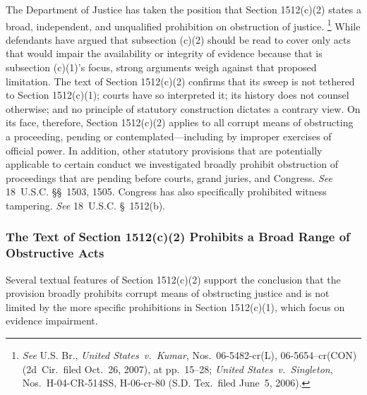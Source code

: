 The Department of Justice has taken the position that Section 1512(c)(2) states a broad, independent, and unqualified prohibition on obstruction of justice.%
\footnote{\textit{See} U.S. Br., \textit{United States~v.\ Kumar}, Nos.~06-5482-cr(L), 06-5654--cr(CON) (2d~Cir.\ filed Oct.~26, 2007), at pp.~15--28; \textit{United States~v.\ Singleton}, Nos.~H-04-CR-514SS, H-06-cr-80 (S.D. Tex.\ filed June~5, 2006).}
While defendants have argued that subsection (c)(2) should be read to cover only acts that would impair the availability or integrity of evidence because that is subsection (c)(1)'s focus, strong arguments weigh against that proposed limitation.
The text of Section 1512(c)(2) confirms that its sweep is not tethered to Section 1512(c)(1); courts have so interpreted it; its history does not counsel otherwise; and no principle of statutory construction dictates a contrary view.
On its face, therefore, Section 1512(c)(2) applies to all corrupt means of obstructing a proceeding, pending or contemplated---including by improper exercises of official power.
In addition, other statutory provisions that are potentially applicable to certain conduct we investigated broadly prohibit obstruction of proceedings that are pending before courts, grand juries, and Congress.
\textit{See} 18~U.S.C. \S\S~1503, 1505.
Congress has also specifically prohibited witness tampering.
\textit{See} 18~U.S.C. \S~1512(b).

\subsubsection{The Text of Section 1512(c)(2) Prohibits a Broad Range of Obstructive Acts}

Several textual features of Section 1512(c)(2) support the conclusion that the provision broadly prohibits corrupt means of obstructing justice and is not limited by the more specific prohibitions in Section 1512(c)(1), which focus on evidence impairment.

